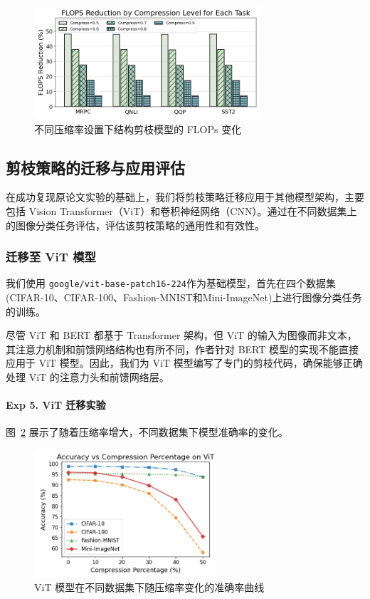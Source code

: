 \documentclass[UTF8,openany]{ctexbook}
\begin{document}
\begin{figure}[H]
    \centering
    \includegraphics[width=0.75\textwidth]{img/cutModelFLops.png}
    \caption{不同压缩率设置下结构剪枝模型的 FLOPs 变化}
    \label{fig:structural_flops_trend}
\end{figure}


\subsection{剪枝策略的迁移与应用评估}

在成功复现原论文实验的基础上，我们将剪枝策略迁移应用于其他模型架构，主要包括 Vision Transformer（ViT）和卷积神经网络（CNN）。通过在不同数据集上的图像分类任务评估，评估该剪枝策略的通用性和有效性。

\subsubsection{迁移至 ViT 模型} 

我们使用 \texttt{google/vit-base-patch16-224}作为基础模型，首先在四个数据集(CIFAR-10、CIFAR-100、Fashion-MNIST和Mini-ImageNet)上进行图像分类任务的训练。

尽管 ViT 和 BERT 都基于 Transformer 架构，但 ViT 的输入为图像而非文本，其注意力机制和前馈网络结构也有所不同，作者针对 BERT 模型的实现不能直接应用于 ViT 模型。因此，我们为 ViT 模型编写了专门的剪枝代码，确保能够正确处理 ViT 的注意力头和前馈网络层。

\paragraph{Exp 5. ViT 迁移实验} 图~\ref{fig:vit_accuracy_trend} 展示了随着压缩率增大，不同数据集下模型准确率的变化。

\begin{figure}[H]
    \centering
    \includegraphics[width=0.6\textwidth]{img/extendOnVIT.png}
    \caption{ViT 模型在不同数据集下随压缩率变化的准确率曲线}
    \label{fig:vit_accuracy_trend}
\end{figure}
\end{document}
